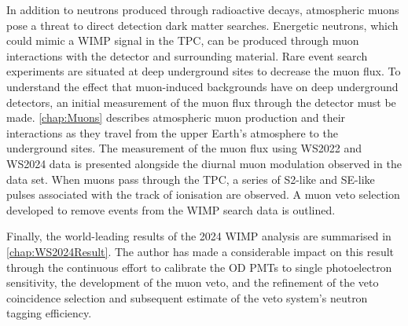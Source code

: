 In addition to neutrons produced through radioactive decays, atmospheric muons pose a threat to direct detection dark matter searches. Energetic neutrons, which could mimic a WIMP signal in the TPC, can be produced through muon interactions with the detector and surrounding material. Rare event search experiments are situated at deep underground sites to decrease the muon flux. To understand the effect that muon-induced backgrounds have on deep underground detectors, an initial measurement of the muon flux through the detector must be made. \autoref{chap:Muons} describes atmospheric muon production and their interactions as they travel from the upper Earth's atmosphere to the underground sites. The measurement of the muon flux using WS2022 and WS2024 data is presented alongside the diurnal muon modulation observed in the data set. When muons pass through the TPC, a series of S2-like and SE-like pulses associated with the track of ionisation are observed. A muon veto selection developed to remove events from the WIMP search data is outlined.

Finally, the world-leading results of the 2024 WIMP analysis are summarised in \autoref{chap:WS2024Result}. The author has made a considerable impact on this result through the continuous effort to calibrate the OD PMTs to single photoelectron sensitivity, the development of the muon veto, and the refinement of the veto coincidence selection and subsequent estimate of the veto system's neutron tagging efficiency.